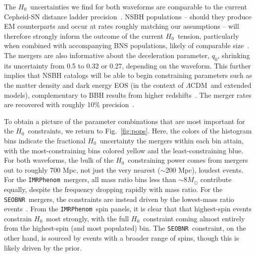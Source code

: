 \documentclass[%
 reprint,
 superscriptaddress,
 nofootinbib,
 amsmath,amssymb,
 aps,
]{revtex4-2}
\newcommand{\msun}{M_\odot}
\newcommand{\hubble}{\ensuremath{H_0}}
\newcommand{\lcdm}{$\Lambda$CDM}
\newcommand{\seobnr}{\texttt{SEOBNR}}
\newcommand{\imrp}{\texttt{IMRPhenom}}
\begin{document}
The \hubble\ uncertainties we find for both waveforms are comparable to the current Cepheid-SN distance ladder precision~\cite{Riess_etal:2019}. NSBH populations -- should they produce EM counterparts and occur at rates roughly matching our assumptions -- will therefore strongly inform the outcome of the current \hubble\ tension, particularly when combined with accompanying BNS populations, likely of comparable size~\cite{Chen_etal:2018,Feeney_etal:2018,Vitale_Chen:2018,Mortlock_etal:2019}. The mergers are also informative about the deceleration parameter, $q_0$, shrinking its uncertainty from 0.5 to 0.32 or 0.27, depending on the waveform. This further implies that NSBH catalogs will be able to begin constraining parameters such as the matter density and dark energy EOS (in the context of \lcdm\ and extended models), complementary to BBH results from higher redshifts~\cite{Farr_etal:2019,Chen_etal:2020,Mukherjee_etal:2020}. The merger rates are recovered with roughly 10\% precision~\cite[e.g.,][]{Ligo:2018,Abbott_etal:2018,LVC:2020O3acat,LVC_O2_pop}.

To obtain a picture of the parameter combinations that are most important for the \hubble\ constraints, we return to Fig.~\ref{fig:pops}. Here, the colors of the histogram bins indicate the fractional \hubble\ uncertainty the mergers within each bin attain, with the most-constraining bins colored yellow and the least-constraining blue. For both waveforms, the bulk of the \hubble\ constraining power comes from mergers out to roughly 700 Mpc, not just the very nearest ($\sim$200 Mpc), loudest events. For the \imrp\ mergers, all mass ratio bins less than $\sim$8$\msun$ contribute equally, despite the frequency dropping rapidly with mass ratio. For the \seobnr\ mergers, the constraints are instead driven by the lowest-mass ratio events~\cite[e.g., ][]{Apostolatos_etal:1994,Cutler_Flanagan:1994}. From the \imrp\ spin panels, it is clear that that highest-spin events constrain \hubble\ most strongly, with the full \hubble\ constraint coming almost entirely from the highest-spin (and most populated) bin. The \seobnr\ constraint, on the other hand, is sourced by events with a broader range of spins, though this is likely driven by the prior.
\end{document}
